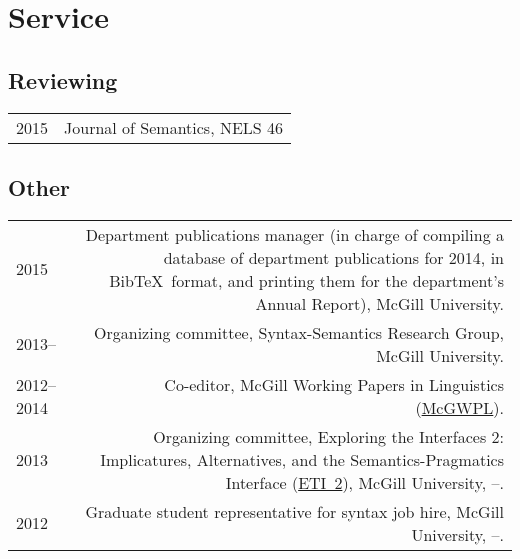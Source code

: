\documentclass[11pt,letterpaper]{article}
\makeatletter
\newcommand{\formatdatenoday}[2]{\mydatenoday\formatdate{0}{#1}{#2}}
\newcommand{\myvrule}{\color{lightgray}\vrule width 1.0pt}
\newenvironment{cvsection}{%
  \renewcommand{\arraystretch}{1.60}
  \begin{longtable}[l]{@{} L R @{}}
}{%
  \end{longtable}
}
\makeatother
\begin{document}
\section*{Service}

\subsection*{Reviewing}

\begin{cvsection}
  2015 & Journal of Semantics, NELS 46
\end{cvsection}

\subsection*{Other}

\begin{cvsection}
  2015 & Department publications manager (in charge of compiling a database of
  department publications for 2014, in Bib\TeX\ format, and printing them for
  the department's Annual Report), McGill University. \\

  2013-- & Organizing committee, Syntax-Semantics Research Group, McGill
  University. \\

  2012--2014 & Co-editor, McGill Working Papers in Linguistics
  (\href{http://www.mcgill.ca/mcgwpl/}{McGWPL}). \\

  2013 & Organizing committee, Exploring the Interfaces 2: Implicatures,
  Alternatives, and the Semantics-Pragmatics Interface
  (\href{https://sites.google.com/site/eti2pragmatics/}{ETI~2}), McGill
  University, \shortmonthname[4]--\formatdatenoday{6}{2013}. \\




  2012 & Graduate student representative for syntax job hire, McGill
  University, \shortmonthname[5]--\formatdatenoday{6}{2012}. \\


\end{cvsection}
\end{document}
